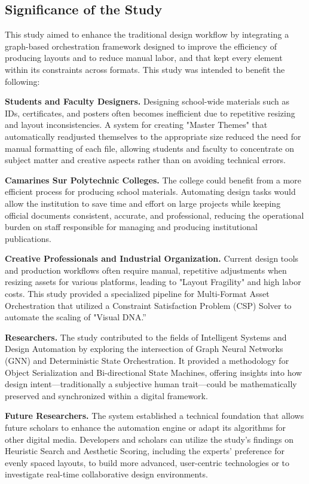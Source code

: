\begin{refsection}
\section{Significance of the Study}

This study aimed to enhance the traditional design workflow by integrating a graph-based orchestration framework designed to improve the efficiency of producing layouts and to reduce manual labor, and that kept every element within its constraints across formats. This study was intended to benefit the following:

\textbf{Students and Faculty Designers.} Designing school-wide materials such as IDs, certificates, and posters often becomes inefficient due to repetitive resizing and layout inconsistencies. A system for creating "Master Themes" that automatically readjusted themselves to the appropriate size reduced the need for manual formatting of each file, allowing students and faculty to concentrate on subject matter and creative aspects rather than on avoiding technical errors.

\textbf{Camarines Sur Polytechnic Colleges.} The college could benefit from a more efficient process for producing school materials. Automating design tasks would allow the institution to save time and effort on large projects while keeping official documents consistent, accurate, and professional, reducing the operational burden on staff responsible for managing and producing institutional publications.

\textbf{Creative Professionals and Industrial Organization.} Current design tools and production workflows often require manual, repetitive adjustments when resizing assets for various platforms, leading to "Layout Fragility" and high labor costs. This study provided a specialized pipeline for Multi-Format Asset Orchestration that utilized a Constraint Satisfaction Problem (CSP) Solver to automate the scaling of "Visual DNA.”

\textbf{Researchers.} The study contributed to the fields of Intelligent Systems and Design Automation by exploring the intersection of Graph Neural Networks (GNN) and Deterministic State Orchestration. It provided a methodology for Object Serialization and Bi-directional State Machines, offering insights into how design intent—traditionally a subjective human trait—could be mathematically preserved and synchronized within a digital framework.

\textbf{Future Researchers.} The system established a technical foundation that allows future scholars to enhance the automation engine or adapt its algorithms for other digital media. Developers and scholars can utilize the study’s findings on Heuristic Search and Aesthetic Scoring, including the experts' preference for evenly spaced layouts, to build more advanced, user-centric technologies or to investigate real-time collaborative design environments.


\end{refsection}
